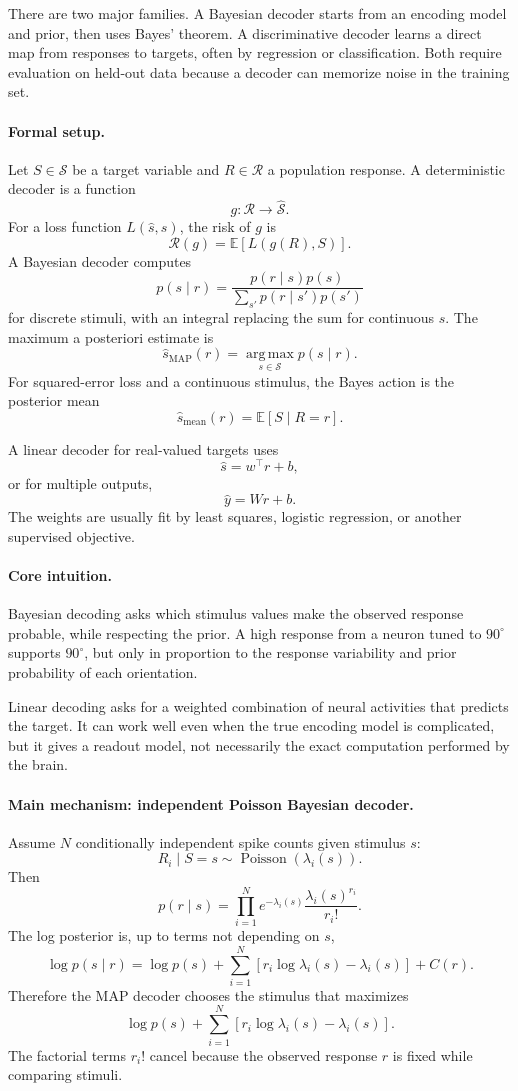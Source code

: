 There are two major families. A Bayesian decoder starts from an encoding model and prior, then uses Bayes' theorem. A discriminative decoder learns a direct map from responses to targets, often by regression or classification. Both require evaluation on held-out data because a decoder can memorize noise in the training set.

\paragraph{Formal setup.}
Let \(S\in\mathcal S\) be a target variable and \(R\in\mathcal R\) a population response. A deterministic decoder is a function
\[
g:\mathcal R\to\widehat{\mathcal S}.
\]
For a loss function \(L(\widehat s,s)\), the risk of \(g\) is
\[
\mathcal R(g)=\mathbb E[L(g(R),S)].
\]
A Bayesian decoder computes
\[
\boxed{
p(s\mid r)=\frac{p(r\mid s)p(s)}{\sum_{s'}p(r\mid s')p(s')}
}
\]
for discrete stimuli, with an integral replacing the sum for continuous \(s\). The maximum a posteriori estimate is
\[
\widehat s_{\mathrm{MAP}}(r)=\operatorname*{arg\,max}_{s\in\mathcal S} p(s\mid r).
\]
For squared-error loss and a continuous stimulus, the Bayes action is the posterior mean
\[
\widehat s_{\mathrm{mean}}(r)=\mathbb E[S\mid R=r].
\]

A linear decoder for real-valued targets uses
\[
\widehat s=w^\top r+b,
\]
or for multiple outputs,
\[
\widehat y=Wr+b.
\]
The weights are usually fit by least squares, logistic regression, or another supervised objective.

\paragraph{Core intuition.}
Bayesian decoding asks which stimulus values make the observed response probable, while respecting the prior. A high response from a neuron tuned to \(90^\circ\) supports \(90^\circ\), but only in proportion to the response variability and prior probability of each orientation.

Linear decoding asks for a weighted combination of neural activities that predicts the target. It can work well even when the true encoding model is complicated, but it gives a readout model, not necessarily the exact computation performed by the brain.

\paragraph{Main mechanism: independent Poisson Bayesian decoder.}
Assume \(N\) conditionally independent spike counts given stimulus \(s\):
\[
R_i\mid S=s\sim\operatorname{Poisson}(\lambda_i(s)).
\]
Then
\[
p(r\mid s)=\prod_{i=1}^N e^{-\lambda_i(s)}\frac{\lambda_i(s)^{r_i}}{r_i!}.
\]
The log posterior is, up to terms not depending on \(s\),
\[
\log p(s\mid r)
=\log p(s)+\sum_{i=1}^N
\left[r_i\log\lambda_i(s)-\lambda_i(s)\right]+C(r).
\]
Therefore the MAP decoder chooses the stimulus that maximizes
\[
\boxed{
\log p(s)+\sum_{i=1}^N
\left[r_i\log\lambda_i(s)-\lambda_i(s)\right].
}
\]
The factorial terms \(r_i!\) cancel because the observed response \(r\) is fixed while comparing stimuli.

